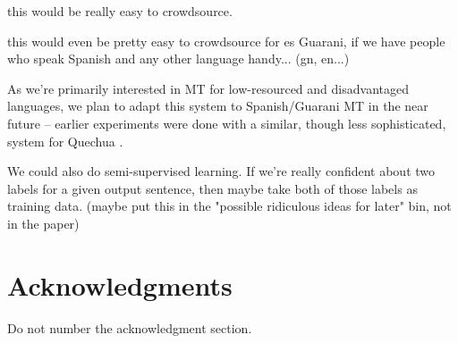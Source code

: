 \documentclass[11pt,letterpaper]{article}
\begin{document}
this would be really easy to crowdsource.

this would even be pretty easy to crowdsource for es Guarani, if we have
people who speak Spanish and any other language handy... (gn, en...)

As we're primarily interested in MT for low-resourced and disadvantaged
languages, we plan to adapt this system to Spanish/Guarani MT in the near
future -- earlier experiments were done with a similar, though less
sophisticated, system for Quechua \cite{rudnick:2011:RANLPStud}.

We could also do semi-supervised learning. If we're really confident about
two labels for a given output sentence, then maybe take both of those labels as
training data. (maybe put this in the "possible ridiculous ideas for later"
bin, not in the paper)



\section*{Acknowledgments}

Do not number the acknowledgment section.


{}
\end{document}
